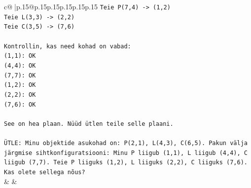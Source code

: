 \documentclass{article}
\begin{document}
{\begin{supertabular}{c@{$\;$}|p{.15\linewidth}@{}p{.15\linewidth}p{.15\linewidth}p{.15\linewidth}p{.15\linewidth}p{.15\linewidth}}
{{{\texttt{Teie P(7,4) {-}> (1,2)} \\
\texttt{Teie L(3,3) {-}> (2,2)} \\
\texttt{Teie C(3,5) {-}> (7,6)} \\
\\ 
\texttt{Kontrollin, kas need kohad on vabad:} \\
\texttt{(1,1): OK} \\
\texttt{(4,4): OK} \\
\texttt{(7,7): OK} \\
\texttt{(1,2): OK} \\
\texttt{(2,2): OK} \\
\texttt{(7,6): OK} \\
\\ 
\texttt{See on hea plaan. Nüüd ütlen teile selle plaani.} \\
\\ 
\texttt{ÜTLE: Minu objektide asukohad on: P(2,1), L(4,3), C(6,5). Pakun välja järgmise sihtkonfiguratsiooni: Minu P liigub (1,1), L liigub (4,4), C liigub (7,7). Teie P liiguks (1,2), L liiguks (2,2), C liiguks (7,6). Kas olete sellega nõus?} \\
            }
        }
    }
    & & \\ \\


\end{supertabular}}
\end{document}
